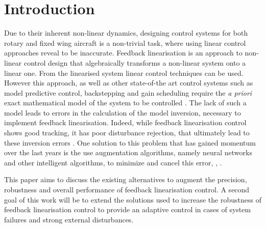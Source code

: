 
\chapter{Introduction}
\label{chapter:introduction}

Due to their inherent non-linear dynamics, designing control systems for both rotary and fixed wing aircraft is a non-trivial task, where using linear control approaches reveal to be inaccurate. Feedback linearisation is an approach to non-linear control design that algebraically transforms a non-linear system onto a linear one. From the linearised system linear control techniques can be used. However this approach, as well as other state-of-the art control systems such as model predictive control, backstepping and gain scheduling require the \textit{a priori} exact mathematical model of the system to be controlled \cite{SotA_IFCS}. The lack of such a model leads to errors in the calculation of the model inversion, necessary to implement feedback linearisation. Indeed, while feedback linearisation control shows good tracking, it has poor disturbance rejection, that ultimately lead to these inversion errors \cite{SotA_ControlAlgorithm}. One solution to this problem that has gained momentum over the last years is the use augmentation algorithms, namely neural networks and other intelligent algorithms, to minimize and cancel this error\cite{NLI+NN}, \cite{NLI+NN_IFCS}, \cite{NLI+NN_chinese}. 

This paper aims to discuss the existing alternatives to augment the precision, robustness and overall performance of feedback linearisation control. A second goal of this work will be to extend the solutions used to increase the robustness of feedback linearisation control to provide an adaptive control in cases of system failures and strong external disturbances.




